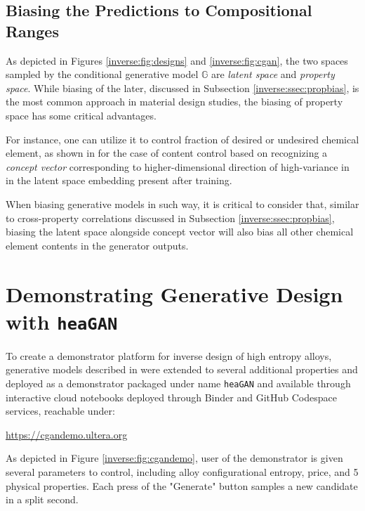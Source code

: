 \subsection{Biasing the Predictions to Compositional Ranges} \label{inverse:ssec:compbias}

As depicted in Figures \ref{inverse:fig:designs} and \ref{inverse:fig:cgan}, the two spaces sampled by the conditional generative model $\mathbb{G}$ are \emph{latent space} and \emph{property space}. While biasing of the later, discussed in Subsection \ref{inverse:ssec:propbias}, is the most common approach in material design studies, the biasing of property space has some critical advantages.

For instance, one can utilize it to control fraction of desired or undesired chemical element, as shown in \citet{Debnath2023ComparingAlloys} for the case of  content control based on recognizing a \emph{concept vector} corresponding to higher-dimensional direction of high-variance in  in the latent space embedding present after training. 

When biasing generative models in such way, it is critical to consider that, similar to cross-property correlations discussed in Subsection \ref{inverse:ssec:propbias}, biasing the latent space alongside  concept vector will also bias all other chemical element contents in the generator outputs.


\section{Demonstrating Generative Design with \texttt{heaGAN}} \label{inverse:sec:heagan}

To create a demonstrator platform for inverse design of high entropy alloys, generative models described in \citet{Debnath2023ComparingAlloys} were extended to several additional properties and deployed as a demonstrator packaged under name \texttt{heaGAN} and available through interactive cloud notebooks deployed through Binder and GitHub Codespace services, reachable under:

\hspace{36pt}\href{https://cgandemo.ultera.org}{https://cgandemo.ultera.org}

As depicted in Figure \ref{inverse:fig:cgandemo}, user of the demonstrator is given several parameters to control, including alloy configurational entropy, price, and 5 physical properties. Each press of the "Generate" button samples a new candidate in a split second.

